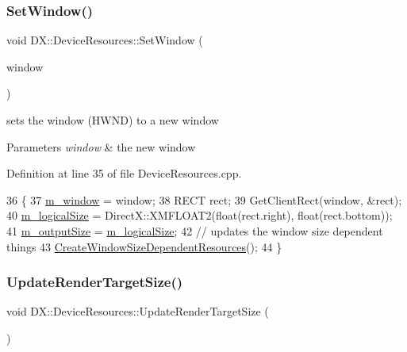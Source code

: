 \subsubsection{\texorpdfstring{Set\+Window()}{SetWindow()}}
{\footnotesize\ttfamily void D\+X\+::\+Device\+Resources\+::\+Set\+Window (\begin{DoxyParamCaption}\item[{H\+W\+ND}]{window }\end{DoxyParamCaption})}



sets the window (H\+W\+ND) to a new window 


\begin{DoxyParams}{Parameters}
{\em window} & the new window \\
\hline
\end{DoxyParams}


Definition at line 35 of file Device\+Resources.\+cpp.


\begin{DoxyCode}
36 \{
37     \mbox{\hyperlink{class_d_x_1_1_device_resources_a71c1253aac157673ae385bf9d705584c}{m\_window}} = window;
38     RECT rect;
39     GetClientRect(window, &rect);
40     \mbox{\hyperlink{class_d_x_1_1_device_resources_a4689509084ecb52b9edf0f6e4ed886d9}{m\_logicalSize}} = DirectX::XMFLOAT2(\textcolor{keywordtype}{float}(rect.right), \textcolor{keywordtype}{float}(rect.bottom));
41     \mbox{\hyperlink{class_d_x_1_1_device_resources_aa102e231efe8bb03f3a91728f8477d08}{m\_outputSize}} = \mbox{\hyperlink{class_d_x_1_1_device_resources_a4689509084ecb52b9edf0f6e4ed886d9}{m\_logicalSize}};
42     \textcolor{comment}{// updates the window size dependent things}
43     \mbox{\hyperlink{class_d_x_1_1_device_resources_a9556306971d5484caaa5a2aac42f253e}{CreateWindowSizeDependentResources}}();
44 \}
\end{DoxyCode}
\mbox{\label{class_d_x_1_1_device_resources_a7adaa47153e97fbbcc524013905635f0}} 
\subsubsection{\texorpdfstring{Update\+Render\+Target\+Size()}{UpdateRenderTargetSize()}}
{\footnotesize\ttfamily void D\+X\+::\+Device\+Resources\+::\+Update\+Render\+Target\+Size (\begin{DoxyParamCaption}{ }\end{DoxyParamCaption})\hspace{0.3cm}{\ttfamily [private]}}



